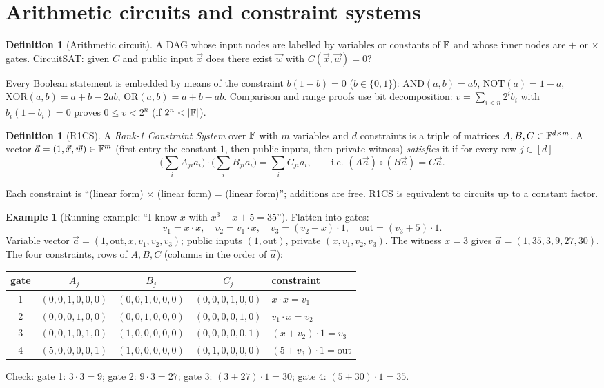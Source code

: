 \documentclass[11pt,a4paper]{report}
\theoremstyle{plain}
\theoremstyle{definition}
\newtheorem{definition}[theorem]{Definition}
\newtheorem{example}[theorem]{Example}
\theoremstyle{remark}
\begin{document}
\section{Arithmetic circuits and constraint systems}
\begin{definition}[Arithmetic circuit]
A DAG whose input nodes are labelled by variables or constants of $\mathbb{F}$ and whose inner nodes are $+$ or $\times$ gates. \textsf{CircuitSAT}: given $C$ and public input $\vec x$ does there exist $\vec w$ with $C(\vec x,\vec w)=0$?
\end{definition}
Every Boolean statement is embedded by means of the constraint $b(1-b)=0$ ($b\in\{0,1\}$): $\mathrm{AND}(a,b)=ab$, $\mathrm{NOT}(a)=1-a$, $\mathrm{XOR}(a,b)=a+b-2ab$, $\mathrm{OR}(a,b)=a+b-ab$. Comparison and range proofs use bit decomposition: $v=\sum_{i<n}2^ib_i$ with $b_i(1-b_i)=0$ proves $0\le v<2^n$ (if $2^n<|\FF|$).

\begin{definition}[R1CS]\label{def:r1cs}
A \emph{Rank-1 Constraint System} over $\mathbb{F}$ with $m$ variables and $d$ constraints is a triple of matrices $A,B,C\in\mathbb{F}^{d\times m}$. A vector $\vec a=(1,\vec x,\vec w)\in\mathbb{F}^m$ (first entry the constant $1$, then public inputs, then private witness) \emph{satisfies} it if for every row $j\in[d]$
\[
\Big(\sum_iA_{ji}a_i\Big)\cdot\Big(\sum_iB_{ji}a_i\Big)=\sum_iC_{ji}a_i,\qquad\text{i.e. }(A\vec a)\circ(B\vec a)=C\vec a.
\]
\end{definition}
Each constraint is ``(linear form) $\times$ (linear form) = (linear form)''; additions are free. R1CS is equivalent to circuits up to a constant factor.

\begin{example}[Running example: ``I know $x$ with $x^3+x+5=35$'']\label{ex:r1cs}
Flatten into gates:
\[ v_1=x\cdot x,\quad v_2=v_1\cdot x,\quad v_3=(v_2+x)\cdot1,\quad \mathrm{out}=(v_3+5)\cdot1. \]
Variable vector $\vec a=(1,\mathrm{out},x,v_1,v_2,v_3)$; public inputs $(1,\mathrm{out})$, private $(x,v_1,v_2,v_3)$. The witness $x=3$ gives $\vec a=(1,35,3,9,27,30)$. The four constraints, rows of $A,B,C$ (columns in the order of $\vec a$):
\begin{center}\small
\begin{tabular}{c|c|c|c|l}
gate & $A_j$ & $B_j$ & $C_j$ & constraint\\\hline
1 & $(0,0,1,0,0,0)$ & $(0,0,1,0,0,0)$ & $(0,0,0,1,0,0)$ & $x\cdot x=v_1$\\
2 & $(0,0,0,1,0,0)$ & $(0,0,1,0,0,0)$ & $(0,0,0,0,1,0)$ & $v_1\cdot x=v_2$\\
3 & $(0,0,1,0,1,0)$ & $(1,0,0,0,0,0)$ & $(0,0,0,0,0,1)$ & $(x+v_2)\cdot1=v_3$\\
4 & $(5,0,0,0,0,1)$ & $(1,0,0,0,0,0)$ & $(0,1,0,0,0,0)$ & $(5+v_3)\cdot1=\mathrm{out}$
\end{tabular}
\end{center}
Check: gate 1: $3\cdot3=9$; gate 2: $9\cdot3=27$; gate 3: $(3+27)\cdot1=30$; gate 4: $(5+30)\cdot1=35$. \checkmark
\end{example}
\end{document}
